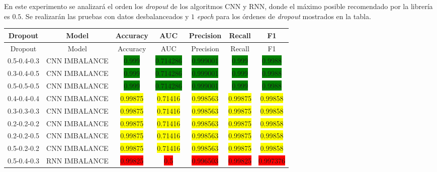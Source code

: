 En este experimento se analizar\'{a} el orden los \textit{dropout} de los algoritmos CNN y RNN, donde el m\'{a}ximo posible recomendado por la librer\'{i}a es $0.5$. Se realizar\'{a}n las pruebas con datos desbalanceados y $1$ \textit{epoch} para los \'{o}rdenes de \textit{dropout} mostrados en la tabla.

	\begin{longtable}{|c|c|c|c|c|c|c|}
		\hline
		Dropout & Model & Accuracy & AUC & Precision & Recall & F1\\ \hline
		\endfirsthead
		\hline
		Dropout & Model & Accuracy & AUC & Precision & Recall & F1\\ \hline
		\endhead
		0.5-0.4-0.3 & CNN IMBALANCE & \colorbox{green}{0.999} & \colorbox{green}{0.714286} & \colorbox{green}{0.999001} & \colorbox{green}{0.999} & \colorbox{green}{0.9988}\\ \hline
		0.3-0.4-0.5 & CNN IMBALANCE & \colorbox{green}{0.999} & \colorbox{green}{0.714286} & \colorbox{green}{0.999001} & \colorbox{green}{0.999} & \colorbox{green}{0.9988}\\ \hline
		0.5-0.5-0.5 & CNN IMBALANCE & \colorbox{green}{0.999} & \colorbox{green}{0.714286} & \colorbox{green}{0.999001} & \colorbox{green}{0.999} & \colorbox{green}{0.9988}\\ \hline
		0.4-0.4-0.4 & CNN IMBALANCE & \colorbox{yellow}{0.99875} & \colorbox{yellow}{0.71416} & \colorbox{yellow}{0.998563} & \colorbox{yellow}{0.99875} & \colorbox{yellow}{0.99858}\\ \hline
		0.3-0.3-0.3 & CNN IMBALANCE & \colorbox{yellow}{0.99875} & \colorbox{yellow}{0.71416} & \colorbox{yellow}{0.998563} & \colorbox{yellow}{0.99875} & \colorbox{yellow}{0.99858}\\ \hline
		0.2-0.2-0.2 & CNN IMBALANCE & \colorbox{yellow}{0.99875} & \colorbox{yellow}{0.71416} & \colorbox{yellow}{0.998563} & \colorbox{yellow}{0.99875} & \colorbox{yellow}{0.99858}\\ \hline
		0.2-0.2-0.5 & CNN IMBALANCE & \colorbox{yellow}{0.99875} & \colorbox{yellow}{0.71416} & \colorbox{yellow}{0.998563} & \colorbox{yellow}{0.99875} & \colorbox{yellow}{0.99858}\\ \hline
		0.5-0.2-0.2 & CNN IMBALANCE & \colorbox{yellow}{0.99875} & \colorbox{yellow}{0.71416} & \colorbox{yellow}{0.998563} & \colorbox{yellow}{0.99875} & \colorbox{yellow}{0.99858}\\ \hline
		0.5-0.4-0.3 & RNN IMBALANCE & \colorbox{red}{0.99825} & \colorbox{red}{0.5} & \colorbox{red}{0.996503} & \colorbox{red}{0.99825} & \colorbox{red}{0.997376}\\ \hline

\end{longtable}
